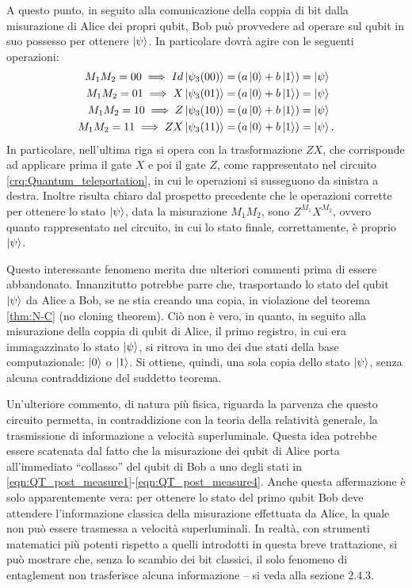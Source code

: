 A questo punto, in seguito alla comunicazione della coppia di bit dalla misurazione di Alice dei propri qubit, Bob può provvedere ad operare sul qubit in suo possesso per ottenere $\ket{\psi}$.
In particolare dovrà agire con le seguenti operazioni:
\begin{align}
 M_1M_2 = 00 \implies Id\ket{\psi_3(00)} =& \left( a \ket{0} + b \ket{1} \right) = \ket{\psi}\\
 M_1M_2 = 01 \implies X\ket{\psi_3(01)} =& \left( a \ket{0} + b \ket{1} \right) = \ket{\psi}\\
 M_1M_2 = 10 \implies Z\ket{\psi_3(10)} =& \left( a \ket{0} + b \ket{1} \right) = \ket{\psi}\\
 M_1M_2 = 11 \implies ZX\ket{\psi_3(11)} =& \left( a \ket{0} + b \ket{1} \right) = \ket{\psi}.
\end{align}
In particolare, nell'ultima riga si opera con la trasformazione $ZX$, che corrisponde ad applicare prima il gate $X$ e poi il gate $Z$, come rappresentato nel circuito \ref{crq:Quantum_teleportation}, in cui le operazioni si susseguono da sinistra a destra.
Inoltre risulta chiaro dal prospetto precedente che le operazioni corrette per ottenere lo stato $\ket{\psi}$, data la misurazione $M_1M_2$, sono $Z^{M_1}X^{M_2}$, ovvero quanto rappresentato nel circuito, in cui lo stato finale, correttamente, è proprio $\ket{\psi}$.

Questo interessante fenomeno merita due ulteriori commenti prima di essere abbandonato.
Innanzitutto potrebbe parre che, trasportando lo stato del qubit $\ket{\psi}$ da Alice a Bob, se ne stia creando una copia, in violazione del teorema \ref{thm:N-C} (no cloning theorem).
Ciò non è vero, in quanto, in seguito alla misurazione della coppia di qubit di Alice, il primo registro, in cui era immagazzinato lo stato $\ket{\psi}$, si ritrova in uno dei due stati della base computazionale: $\ket{0}$ o $\ket{1}$.
Si ottiene, quindi, una sola copia dello stato $\ket{\psi}$, senza alcuna contraddizione del suddetto teorema.

Un'ulteriore commento, di natura più fisica, riguarda la parvenza che questo circuito permetta, in contraddizione con la teoria della relatività generale, la trasmissione di informazione a velocità superluminale.
Questa idea potrebbe essere scatenata dal fatto che la misurazione dei qubit di Alice porta all'immediato ``collasso'' del qubit di Bob a uno degli stati in \eqref{eqn:QT_post_measure1}-\eqref{eqn:QT_post_measure4}. 
Anche questa affermazione è solo apparentemente vera: per ottenere lo stato del primo qubit Bob deve attendere l'informazione classica della misurazione effettuata da Alice, la quale non può essere trasmessa a velocità superluminali.
In realtà, con strumenti matematici più potenti rispetto a quelli introdotti in questa breve trattazione, si può mostrare che, senza lo scambio dei bit classici, il solo fenomeno di entaglement non trasferisce alcuna informazione -- si veda \cite{Book:QCQI} alla sezione 2.4.3.

